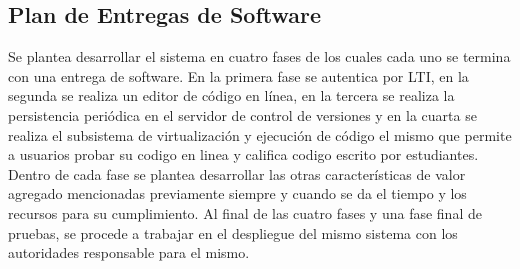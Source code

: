 \subsection{Plan de Entregas de Software}
Se plantea desarrollar el sistema en cuatro fases de los cuales cada uno se termina con una entrega de software. En la primera fase se autentica por LTI, en la segunda se realiza un editor de código en línea, en la tercera se realiza la persistencia periódica en el servidor de control de versiones y en la cuarta se realiza el subsistema de virtualización y ejecución de código el mismo que permite a usuarios probar su codigo en linea y califica codigo escrito por estudiantes. Dentro de cada fase se plantea desarrollar las otras características de valor agregado mencionadas previamente siempre y cuando se da el tiempo y los recursos para su cumplimiento. Al final de las cuatro fases y una fase final de pruebas, se procede a trabajar en el despliegue del mismo sistema con los autoridades responsable para el mismo.
